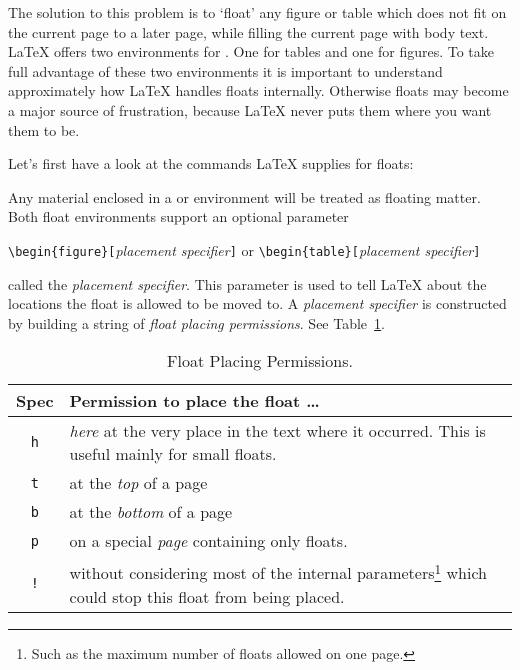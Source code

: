 The solution to this problem is to `float' any figure or table which
does not fit on the current page to a later page, while filling the
current page with body text. \LaTeX{} offers two environments for
. One for tables and  one for figures.  To
take full advantage of these two environments it is important to
understand approximately how \LaTeX{} handles floats internally.
Otherwise floats may become a major source of frustration, because
\LaTeX{} never puts them where you want them to be.

\bigskip
Let's first have a look at the commands \LaTeX{} supplies
for floats:

Any material enclosed in a  or  environment will
be treated as floating matter. Both float environments support an optional
parameter
\begin{command}
\verb|\begin{figure}[|\emph{placement specifier}\verb|]| or
\verb|\begin{table}[|\emph{placement specifier}\verb|]|
\end{command}
\noindent called the \emph{placement specifier}. This parameter
is used to tell \LaTeX{} about the locations the float is allowed to
be moved to.  A \emph{placement specifier} is constructed by building a string
of \emph{float placing permissions}. See Table~\ref{tab:permiss}.

\begin{table}[!bp]
\caption{Float Placing Permissions.}\label{tab:permiss}
\noindent \begin{minipage}{\textwidth}
\medskip
\begin{center}
\begin{tabular}{@{}cp{10cm}@{}}
Spec&Permission to place the float \ldots\\
\hline
\rule{0pt}{1.05em}\texttt{h} & \emph{here} at the very place in the text
  where it occurred.  This is useful mainly for small floats.\\[0.3ex]
\texttt{t} & at the \emph{top} of a page\\[0.3ex]
\texttt{b} & at the \emph{bottom} of a page\\[0.3ex]
\texttt{p} & on a special \emph{page} containing only floats.\\[0.3ex]
\texttt{!} & without considering most of the  internal parameters\footnote{Such as the
    maximum number of floats allowed  on one page.} which could stop this
  float from being placed.
\end{tabular}
\end{center}
\end{minipage}
\end{table}

